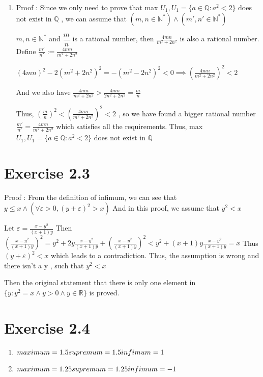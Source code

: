 \documentclass{article}
\begin{document}
\begin{enumerate}
    \item Proof : Since we only need to prove that max $U_1,U_1=\{a\in \mathbb{Q} \colon a^2<2 \}$ does not exist in $\mathbb{Q}$ , we can assume that $ (m,n\in \mathbb{N}^* )\wedge  (m',n'\in \mathbb{N}^* )	$
    
    $m,n\in \mathbb{N}^*$ and $\dfrac{m}{n}$ is a rational number, then $\frac{4 m n}{m^2+2 n^2}$ is also a rational number. Define $\frac{m'}{n'} := \frac{4 m n}{m^2+2 n^2}$
    
    $ (4mn)^2-2(m^2+2n^2)^2=-(m^2-2n^2)^2<0 \implies
   ( \frac{4 m n}{m^2+2 n^2})^2<2		$ 
   
   And we also have 
      $	\frac{4 m n}{m^2+2 n^2}> \frac{4mn}{2n^2+2n^2}=\frac{m}{n}	$
   
   Thus, $ (\frac{m}{n})^2 < (\frac{4 m n}{m^2+2 n^2})^2 < 2 $ , so we have found a bigger rational number $\frac{m'}{n'} = \frac{4 m n}{m^2+2 n^2}$ which satisfies all the requirements. Thus, max $U_1,U_1=\{a\in \mathbb{Q} \colon a^2<2 \}$ does not exist in $\mathbb{Q}$
   
   
      							

\end{enumerate}


\section{Exercise 2.3}
Proof : 
From the definition of infimum, we can see that $	y\leq x \wedge (\forall \varepsilon >0 ,(y+\varepsilon)^2 >x)	$ And in this proof, we assume that $y^2< x$

Let $\varepsilon=\frac{x-y^2}{(x+1)y}$ Then $(\frac{x-y^2}{(x+1)y})^2=y^2+2y\frac{x-y^2}{(x+1)y}+(\frac{x-y^2}{(x+1)y})^2< y^2 +(x+1)y\frac{x-y^2}{(x+1)y}=x$ Thus $(y+\varepsilon)^2<x$ which leads to a contradiction. Thus, the assumption is wrong and there isn't a y , such that $y^2< x$ 

Then the original statement that there is only one element in  $\{y:y^2= x \wedge y>0 \wedge y \in \mathbb{R}\}$ is proved.



\section{Exercise 2.4}



\begin{enumerate}
	\item $maximum=1.5 \\ supremum=1.5 \\infimum=1$
	\item $maximum=1.25 \\ supremum=1.25 \\infimum=-1	$
\end{enumerate}
\end{document}

